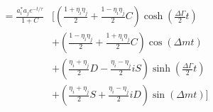 \documentclass[a4paper,10pt,twosided]{article}
\begin{document}
\begin{eqnarray}
                                &= \frac{ a_i^* a_j e^{-t/\tau}} {1+C}&\Biggl[ \left( \frac{1+\eta_i\eta_j}{2} +  \frac{1-\eta_i\eta_j}{2}C\right) \cosh\left(\frac{\Delta\Gamma}{2}t\right)\nonumber \\
                                                                          &&  +\left( \frac{1-\eta_i\eta_j}{2} +  \frac{1+\eta_i\eta_j}{2}C\right) \cos(\Delta m t) \nonumber\\
                                                                          &&  +\left( \frac{\eta_i+\eta_j}{2}D - \frac{\eta_i-\eta_j}{2}iS\right) \sinh\left(\frac{\Delta\Gamma}{2}t\right) \nonumber\\
                                                                          &&  +\left( \frac{\eta_i+\eta_j}{2}S + \frac{\eta_i-\eta_j}{2}iD\right) \sin(\Delta m t) \Biggr] 
\end{eqnarray}
\end{document}
